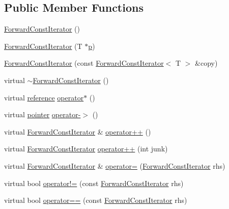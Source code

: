 \subsection*{Public Member Functions}
\begin{DoxyCompactItemize}
\item 
\hyperlink{classprism_1_1_forward_const_iterator_aee0b75e34fd106fc31bb63618089cd68}{Forward\+Const\+Iterator} ()
\item 
\hyperlink{classprism_1_1_forward_const_iterator_a788a7ad191bae8f5a8c5aadf5c85e6de}{Forward\+Const\+Iterator} (T $\ast$\hyperlink{classprism_1_1_forward_const_iterator_ad4e0c824b923c399c6ee381a03e66df2}{p})
\item 
\hyperlink{classprism_1_1_forward_const_iterator_a9db8d1feaaa08c62dc2615e708198843}{Forward\+Const\+Iterator} (const \hyperlink{classprism_1_1_forward_const_iterator}{Forward\+Const\+Iterator}$<$ T $>$ \&copy)
\item 
virtual \hyperlink{classprism_1_1_forward_const_iterator_a67b8cd8e6c8929b8ef88fddac62f2058}{$\sim$\+Forward\+Const\+Iterator} ()
\item 
virtual \hyperlink{classprism_1_1_forward_const_iterator_a839eeb121503b031260ad21ef844dd9a}{reference} \hyperlink{classprism_1_1_forward_const_iterator_aa2c258793cfc86a62dac31854deadab2}{operator$\ast$} ()
\item 
virtual \hyperlink{classprism_1_1_forward_const_iterator_a6e4e245d3ab99d6e9b237abe2c0c06d8}{pointer} \hyperlink{classprism_1_1_forward_const_iterator_a573e5c6144470a8030e82116c1674983}{operator-\/$>$} ()
\item 
virtual \hyperlink{classprism_1_1_forward_const_iterator}{Forward\+Const\+Iterator} \& \hyperlink{classprism_1_1_forward_const_iterator_a8a73dd55dac644cdd0f102d35c74c434}{operator++} ()
\item 
virtual \hyperlink{classprism_1_1_forward_const_iterator}{Forward\+Const\+Iterator} \hyperlink{classprism_1_1_forward_const_iterator_aa00254618332a18101e60a84ec9d44d7}{operator++} (int junk)
\item 
virtual \hyperlink{classprism_1_1_forward_const_iterator}{Forward\+Const\+Iterator} \& \hyperlink{classprism_1_1_forward_const_iterator_a72c3696ffe630ed434d188dcbaea28de}{operator=} (\hyperlink{classprism_1_1_forward_const_iterator}{Forward\+Const\+Iterator} rhs)
\item 
virtual bool \hyperlink{classprism_1_1_forward_const_iterator_aa370c912df9e042cbe4def9b48cf0f1d}{operator!=} (const \hyperlink{classprism_1_1_forward_const_iterator}{Forward\+Const\+Iterator} rhs)
\item 
virtual bool \hyperlink{classprism_1_1_forward_const_iterator_ab3bfd9e80ed15677622622ceb173bb20}{operator==} (const \hyperlink{classprism_1_1_forward_const_iterator}{Forward\+Const\+Iterator} rhs)
\end{DoxyCompactItemize}
